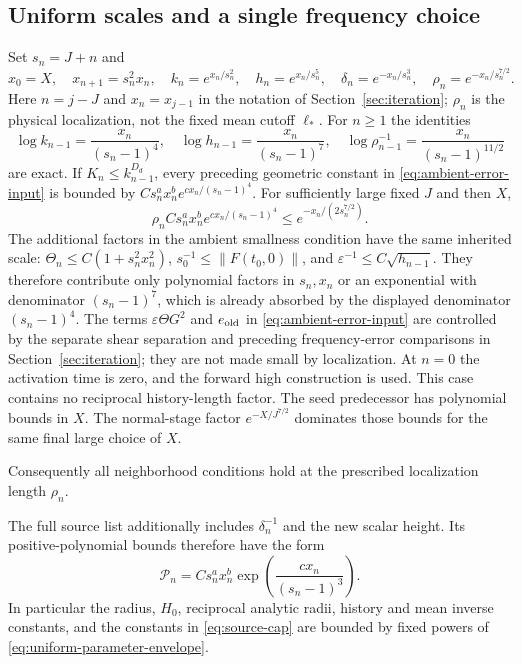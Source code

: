 \documentclass[11pt]{article}
\theoremstyle{definition}
\begin{document}
\subsection{Uniform scales and a single frequency choice}

Set $s_n=J+n$ and
\[
 x_0=X,\quad x_{n+1}=s_n^2x_n,\quad
 k_n=e^{x_n/s_n^2},\quad h_n=e^{x_n/s_n^5},\quad
 \delta_n=e^{-x_n/s_n^3},\quad\rho_n=e^{-x_n/s_n^{7/2}}.
\]
Here $n=j-J$ and $x_n=x_{j-1}$ in the notation of
Section~\ref{sec:iteration}; $\rho_n$ is the physical localization,
not the fixed mean cutoff $\ell_*$. For $n\geq1$ the identities
\[
 \log k_{n-1}=\frac{x_n}{(s_n-1)^4},\quad
 \log h_{n-1}=\frac{x_n}{(s_n-1)^7},\quad
 \log\rho_{n-1}^{-1}=\frac{x_n}{(s_n-1)^{11/2}}
\]
are exact. If $K_n\leq k_{n-1}^{D_d}$, every preceding geometric constant in
\eqref{eq:ambient-error-input} is bounded by
$Cs_n^a x_n^b e^{c x_n/(s_n-1)^4}$.
For sufficiently large fixed $J$ and then $X$,
\[
 \rho_n Cs_n^a x_n^b e^{c x_n/(s_n-1)^4}
 \leq e^{-x_n/(2s_n^{7/2})}.
\]
The additional factors in the ambient smallness condition have the same
inherited scale: $\Theta_n\leq C(1+s_n^2x_n^2)$,
$s_0^{-1}\leq\|F(t_0,0)\|$, and
$\varepsilon^{-1}\leq C\sqrt{h_{n-1}}$.
They therefore contribute only polynomial factors in $s_n,x_n$ or an
exponential with denominator $(s_n-1)^7$, which is already absorbed
by the displayed denominator $(s_n-1)^4$. The terms
$\varepsilon\Theta G^2$ and $e_{\rm old}$ in
\eqref{eq:ambient-error-input} are controlled by the separate shear
separation and preceding frequency-error comparisons in
Section~\ref{sec:iteration}; they are not made small by localization.
At $n=0$ the activation time is zero, and the forward high construction
is used. This case contains no reciprocal history-length factor.
The seed predecessor has polynomial bounds in $X$. The normal-stage
factor $e^{-X/J^{7/2}}$ dominates those bounds for the same final large choice of $X$.

Consequently all neighborhood conditions hold at the prescribed
localization length $\rho_n$.

The full source list additionally includes $\delta_n^{-1}$ and the
new scalar height. Its positive-polynomial bounds therefore have the
form
\begin{equation}\label{eq:uniform-parameter-envelope}
 \mathcal P_n=Cs_n^a x_n^b
              \exp\left(\frac{c x_n}{(s_n-1)^3}\right).
\end{equation}
In particular the radius, $H_0$, reciprocal analytic radii, history
and mean inverse constants, and the constants in \eqref{eq:source-cap}
are bounded by fixed powers of \eqref{eq:uniform-parameter-envelope}.
\end{document}
